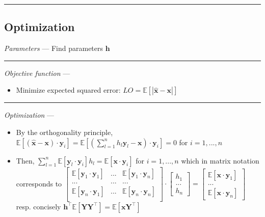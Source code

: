{\color{black}\hrule height 0.001mm}

\subsection*{Optimization}
\emph{Parameters} --- Find parameters $\boldsymbol{h}$

{\color{lightgray}\hrule height 0.001mm}

\emph{Objective function} --- 
\begin{itemize}
    \item Minimize expected squared error: $LO = \mathbb{E}[ | \hat{\boldsymbol{x}} - \boldsymbol{x} | ]$
\end{itemize}

{\color{lightgray}\hrule height 0.001mm}

\emph{Optimization} ---
\begin{itemize}
    \item By the orthogonality principle, $\mathbb{E} [ ( \hat{\boldsymbol{x}} - \boldsymbol{x} ) \cdot \boldsymbol{y}_i ] = \mathbb{E} [ ( \sum_{l=1}^n h_l \boldsymbol{y}_l - \boldsymbol{x} ) \cdot \boldsymbol{y}_i ] = 0$ for $i = 1, ..., n$
    \item Then, $\sum_{l=1}^n \mathbb{E}[ \boldsymbol{y}_l \cdot \boldsymbol{y}_i ] h_l = \mathbb{E}[ \boldsymbol{x} \cdot \boldsymbol{y}_i ]$ for $i = 1, ..., n$ which in matrix notation corresponds to
    $\begin{bmatrix}
    \mathbb{E}[\boldsymbol{y}_1 \cdot \boldsymbol{y}_1] & ... & \mathbb{E}[\boldsymbol{y}_1 \cdot \boldsymbol{y}_n]\\
    ... & ... & ...\\
    \mathbb{E}[\boldsymbol{y}_n \cdot \boldsymbol{y}_1] & ... & \mathbb{E}[\boldsymbol{y}_n \cdot \boldsymbol{y}_n]\\
    \end{bmatrix} \cdot 
    \begin{bmatrix}
    h_1 \\
    ... \\
    h_n
    \end{bmatrix} = 
    \begin{bmatrix}
    \mathbb{E}[\boldsymbol{x} \cdot \boldsymbol{y}_1]\\
    ...\\
    \mathbb{E}[\boldsymbol{x} \cdot \boldsymbol{y}_n]
    \end{bmatrix}$
    resp. concisely
    $\boldsymbol{h}^\intercal \mathbb{E}[ \boldsymbol{Y} \boldsymbol{Y}^\intercal ] = \mathbb{E}[\boldsymbol{x}  \boldsymbol{Y}^\intercal]$
\end{itemize}